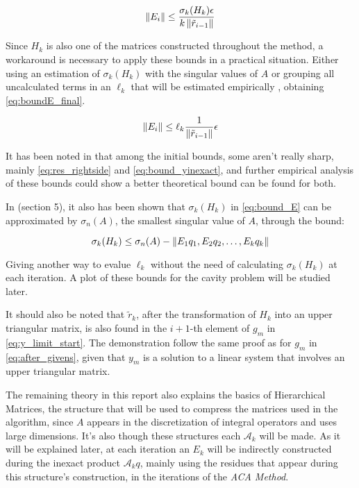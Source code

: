 \begin{equation}\label{eq:bound_E}
    \left\lVert E_{i}\right\rVert \leq \frac{\sigma_{k}(H_{k})\epsilon}{k\left\lVert\tilde{r}_{i-1}\right\rVert}
\end{equation}

Since $H_{k}$ is also one of the matrices constructed throughout the method, a workaround is necessary to apply these bounds in a practical situation. Either using an estimation of $\sigma_{k}(H_{k})$ with the singular values of $A$ or grouping all uncalculated terms in an $\ell_{k}$ that will be estimated empirically \cite{simoncini2003theory}, obtaining \ref{eq:boundE_final}.

\begin{equation}\label{eq:boundE_final}
    \left\lVert E_{i}\right\rVert \leq \ell_{k} \frac{1}{\left\lVert\tilde{r}_{i-1}\right\rVert} \epsilon
\end{equation}

It has been noted in \cite{simoncini2003theory} that among the initial bounds, some aren't really sharp, mainly \ref{eq:res_rightside} and \ref{eq:bound_yinexact}, and further empirical analysis of these bounds could show a better theoretical bound can be found for both.

In \cite{simoncini2003theory}(section 5), it also has been shown that $\sigma_{k}(H_{k})$ in \autoref{eq:bound_E} can be approximated by $\sigma_{n}(A)$, the smallest singular value of $A$, through the bound:

\begin{equation}
    \sigma_{k}(H_{k}) \leq \sigma_{n}(A) - \left\lVert E_{1}q_{1}, E_{2}q_{2}, \dots, E_{k}q_{k}\right\rVert
\end{equation}

Giving another way to evalue $\ell_{k}$ without the need of calculating $\sigma_{k}(H_{k})$ at each iteration. A plot of these bounds for the cavity problem will be studied later.

It should also be noted that $\tilde{r}_{k}$, after the transformation of $H_{k}$ into an upper triangular matrix, is also found in the $i+1$-th element of $g_{m}$ in \ref{eq:y_limit_start}. The demonstration follow the same proof as for $g_{m}$ in \ref{eq:after_givens}, given that $y_{m}$ is a solution to a linear system that involves an upper triangular matrix.

The remaining theory in this report also explains the basics of Hierarchical Matrices, the structure that will be used to compress the matrices used in the algorithm, since $A$ appears in the discretization of integral operators and uses large dimensions.
It's also though these structures each $\mathcal{A}_{k}$ will be made. As it will be explained later, at each iteration an $E_{k}$ will be indirectly constructed during the inexact product $\mathcal{A}_{k}q$, mainly using the residues that appear during this structure's construction, in the iterations of the \textit{ACA Method}.